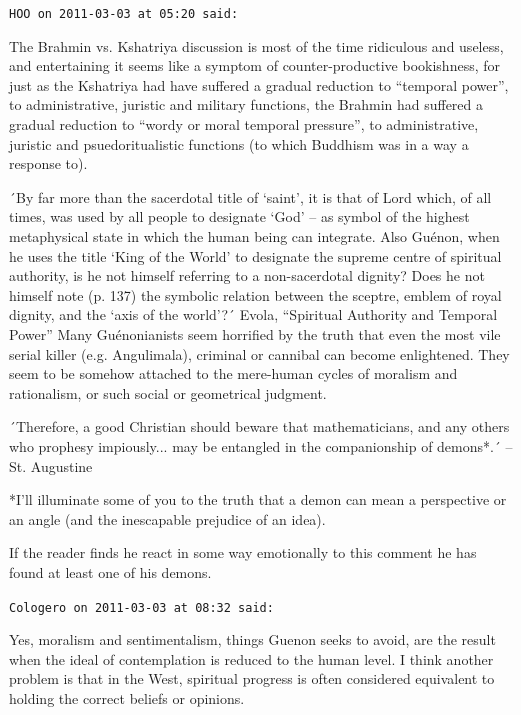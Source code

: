 \begin{footnotesize}
\begin{sffamily}
\texttt{HOO on 2011-03-03 at 05:20 said:}

The Brahmin vs. Kshatriya discussion is most of the time ridiculous and useless, and entertaining it seems like a symptom of counter-productive bookishness, for just as the Kshatriya had have suffered a gradual reduction to ``temporal power'', to administrative, juristic and military functions, the Brahmin had suffered a gradual reduction to ``wordy or moral temporal pressure'', to administrative, juristic and psuedoritualistic functions (to which Buddhism was in a way a response to).

´By far more than the sacerdotal title of `saint', it is that of Lord which, of all times, was used by all people to designate `God' -- as symbol of the highest metaphysical state in which the human being can integrate. Also Guénon, when he uses the title `King of the World' to designate the supreme centre of spiritual authority, is he not himself referring to a non-sacerdotal dignity? Does he not himself note (p. 137) the symbolic relation between the sceptre, emblem of royal dignity, and the `axis of the world'?´ Evola, ``Spiritual Authority and Temporal Power'' Many Guénonianists seem horrified by the truth that even the most vile serial killer (e.g. Angulimala), criminal or cannibal can become enlightened. They seem to be somehow attached to the mere-human cycles of moralism and rationalism, or such social or geometrical judgment.

´Therefore, a good Christian should beware that mathematicians, and any others who prophesy impiously... may be entangled in the companionship of demons*.´ -- St. Augustine

*I'll illuminate some of you to the truth that a demon can mean a perspective or an angle (and the inescapable prejudice of an idea).

If the reader finds he react in some way emotionally to this comment he has found at least one of his demons.

\hfill

\texttt{Cologero on 2011-03-03 at 08:32 said:}

Yes, moralism and sentimentalism, things Guenon seeks to avoid, are the result when the ideal of contemplation is reduced to the human level. I think another problem is that in the West, spiritual progress is often considered equivalent to holding the correct beliefs or opinions.


\end{sffamily}
\end{footnotesize}
